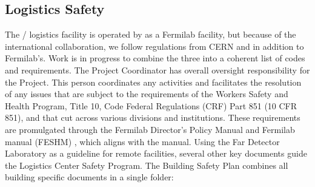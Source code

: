 
\subsection{Logistics Safety}
\label{sec:fdsp-tc-log-safety}

The / logistics facility
  is operated by   as a Fermilab facility, but because of the international collaboration, we  follow  regulations from CERN and  in addition to Fermilab's.  Work is in progress to combine the three into a coherent list of codes and requirements. The  Project  Coordinator has overall  oversight responsibility for the  Project.  This person coordinates any  activities and facilitates the resolution of any issues that are subject to the requirements of the  Workers Safety and Health Program, Title 10, Code Federal Regulations (CRF) Part 851 (10 CFR 851), and that cut across various divisions  and institutions. These requirements are promulgated through the Fermilab Director's Policy Manual  and Fermilab  manual (FESHM) , which aligns with the   manual.  Using the  Far Detector Laboratory as a guideline for remote facilities, several other key documents guide the Logistics Center Safety Program.  The Building Safety Plan  combines all building specific documents in a single folder:

